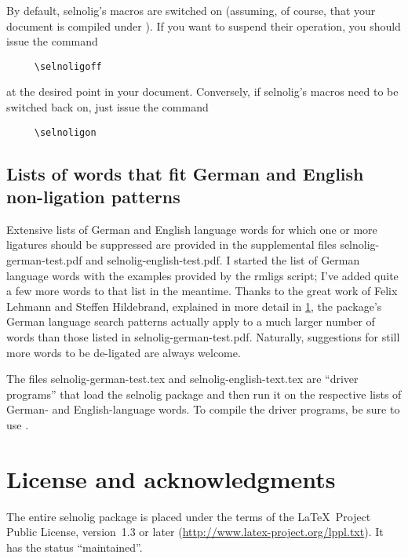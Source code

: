 \documentclass[11pt]{article}
\newcommand{\pkg}[1]{\textsf{#1}}
\begin{document}
By default, \pkg{selnolig}'s macros are switched on (assuming, of course, that your document is compiled under \LuaLaTeX). If you want to suspend their operation, you should issue the command
\begin{Verbatim}
     \selnoligoff
\end{Verbatim}
at the desired point in your document. Conversely, if \pkg{selnolig}'s macros need to be switched back on, just issue the command
\begin{Verbatim}
     \selnoligon
\end{Verbatim}


\subsection{Lists of words that fit German and English non-ligation patterns}

Extensive lists of German and English language words for which one or more ligatures should be suppressed are provided in the supplemental files \pkg{selnolig-german-test.pdf} and \pkg{selnolig-english-test.pdf}. I started the list of German language words with the examples provided by the \pkg{rmligs} script; I've added quite a few more words to that list in the meantime. Thanks to the great work of Felix Lehmann and Steffen Hildebrand, explained in more detail in \cref{sec:thanks}, the package's German language search patterns actually apply to a much larger number of words than those listed in \pkg{selnolig-german-test.pdf}. Naturally, suggestions for still more words to be de-ligated are always welcome.

The files \pkg{selnolig-german-test.tex} and \pkg{selnolig-english-text.tex} are \enquote{driver programs} that load the \pkg{selnolig} package and then run it on the respective lists of German- and English-language words. To compile the driver programs, be sure to use \LuaLaTeX.

\section{License and acknowledgments} \label{sec:thanks}

The entire \pkg{selnolig} package is placed under the terms of the \LaTeX\ Project Public License, version~1.3 or later (\url{http://www.latex-project.org/lppl.txt}).
It has the status \enquote{maintained}.
\end{document}
